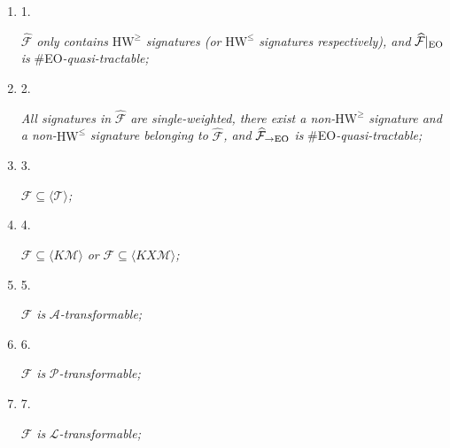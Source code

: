 \documentclass[10pt,a4paper]{article}
\begin{document}
\begin{enumerate}


\item[] 
1. 


$\widehat{\mathcal{F}}$\emph{ only contains }$\text{HW}^{\geq}$\emph{ signatures (or }$\text{HW}^{\leq}$\emph{ signatures respectively), and }$\widehat{\mathcal{F}}|_{\textup{{EO}}}$\emph{ is }\#EO\emph{-quasi-tractable;}\par





\item[] 
2. 


\emph{All signatures in }$\widehat{\mathcal{F}}$\emph{ are single-weighted, there exist a non-}$\text{HW}^{\geq}$\emph{ signature and a non-}$\text{HW}^{\leq}$\emph{ signature belonging to }$\widehat{\mathcal{F}}$\emph{, and }$\widehat{\mathcal{F}}_{\to\textup{{EO}}}$\emph{ is }\#EO\emph{-quasi-tractable;}\par





\item[] 
3. 


$\mathcal{F}\subseteq\langle\mathcal{T}\rangle$\emph{;}\par





\item[] 
4. 


$\mathcal{F}\subseteq\langle K\mathcal{M}\rangle$\emph{ or }$\mathcal{F}\subseteq\langle KX\mathcal{M}\rangle$\emph{;}\par





\item[] 
5. 


$\mathcal{F}$\emph{ is }$\mathscr{A}$\emph{-transformable;}\par





\item[] 
6. 


$\mathcal{F}$\emph{ is }$\mathscr{P}$\emph{-transformable;}\par





\item[] 
7. 


$\mathcal{F}$\emph{ is }$\mathscr{L}$\emph{-transformable;}\par





\end{enumerate}
\end{document}
